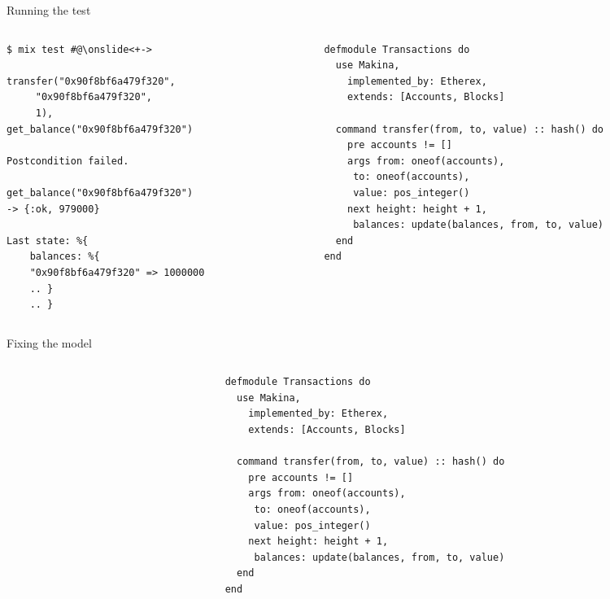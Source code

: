 \documentclass[aspectratio=169, 10pt, handout]{beamer}
\begin{document}
\begin{frame}[label={sec:orgd72411c},fragile]{Running the test}
 \begin{columns}
\begin{column}{0.44\columnwidth}
\lstset{language=bash,label= ,caption= ,captionpos=b,numbers=none,style=shell}
\begin{lstlisting}
$ mix test #@\onslide<+->

transfer("0x90f8bf6a479f320",
	 "0x90f8bf6a479f320",
	 1),
get_balance("0x90f8bf6a479f320")

Postcondition failed.

get_balance("0x90f8bf6a479f320")
-> {:ok, 979000}

Last state: %{
    balances: %{
	"0x90f8bf6a479f320" => 1000000
	.. }
    .. }
\end{lstlisting}
\end{column}

\begin{column}{0.52\columnwidth}
\onslide<+->
\lstset{language=elixir,label= ,caption= ,captionpos=b,numbers=none,style=display}
\begin{lstlisting}
defmodule Transactions do
  use Makina,
    implemented_by: Etherex,
    extends: [Accounts, Blocks]

  command transfer(from, to, value) :: hash() do
    pre accounts != []
    args from: oneof(accounts),
	 to: oneof(accounts),
	 value: pos_integer()
    next height: height + 1,
	 balances: update(balances, from, to, value)
  end
end
\end{lstlisting}
\end{column}
\end{columns}
\end{frame}

\begin{frame}[label={sec:org6cea16a},fragile]{Fixing the model}
 \begin{columns}
\begin{column}{0.44\columnwidth}
\end{column}
\begin{column}{0.52\columnwidth}
\onslide<+->
\lstset{language=elixir,label= ,caption= ,captionpos=b,numbers=none,style=display}
\begin{lstlisting}
defmodule Transactions do
  use Makina,
    implemented_by: Etherex,
    extends: [Accounts, Blocks]

  command transfer(from, to, value) :: hash() do
    pre accounts != []
    args from: oneof(accounts),
	 to: oneof(accounts),
	 value: pos_integer()
    next height: height + 1,
	 balances: update(balances, from, to, value)
  end
end
\end{lstlisting}
\end{column}
\end{columns}
\end{frame}
\end{document}
